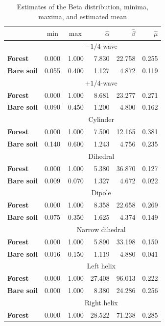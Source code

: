 \documentclass[conference]{IEEEtran}
\begin{document}
\balance
\begin{table}[hbt]
\centering
\caption{Estimates of the Beta distribution, minima, maxima, and estimated mean}\label{tab:estimated_params}     
\begin{tabular}{lrrrrr}
\toprule
& $\min$ & $\max$ & $\widehat\alpha$ & $\widehat\beta$ & $\widehat\mu$\\ \midrule
& \multicolumn{5}{c}{$-1/4$-wave}\\
\cmidrule(lr){2-6}
\textbf{Forest} & 0.000 & 1.000 & 7.830 & 22.758 & 0.255\\
\textbf{Bare soil} & 0.055 & 0.400 & 1.127 & 4.872 & 0.119\\
\midrule
%
& \multicolumn{5}{c}{$+1/4$-wave}\\
\cmidrule(lr){2-6}
\textbf{Forest} & 0.000 & 1.000 & 8.681 & 23.277 & 0.271\\
\textbf{Bare soil} & 0.090 & 0.450 & 1.200 & 4.800 & 0.162\\
\midrule
%
& \multicolumn{5}{c}{Cylinder}\\
\cmidrule(lr){2-6}
\textbf{Forest} & 0.000 & 1.000 & 7.500 & 12.165 & 0.381\\
\textbf{Bare soil} & 0.140 & 0.600 & 1.243 & 4.756 & 0.235\\
\midrule
%
& \multicolumn{5}{c}{Dihedral}\\
\cmidrule(lr){2-6}
\textbf{Forest} & 0.000 & 1.000 & 5.380 & 36.870 & 0.127\\
\textbf{Bare soil} & 0.009 & 0.070 & 1.327 & 4.672 & 0.022\\
\midrule
%
& \multicolumn{5}{c}{Dipole}\\
\textbf{Forest} & 0.000 & 1.000 & 8.358 & 22.658 & 0.269\\
\textbf{Bare soil} & 0.075 & 0.350 & 1.625 & 4.374 & 0.149\\
\midrule
%
& \multicolumn{5}{c}{Narrow dihedral}\\
\cmidrule(lr){2-6}
\textbf{Forest} & 0.000 & 1.000 & 5.890 & 33.198 & 0.150\\
\textbf{Bare soil} & 0.016 & 0.150 & 1.119 & 4.880 & 0.041\\
\midrule
%
& \multicolumn{5}{c}{Left helix}\\
\cmidrule(lr){2-6}
\textbf{Forest} & 0.000 & 1.000 & 27.408 & 96.013 & 0.222\\
\textbf{Bare soil} & 0.000 & 1.000 & 8.380 & 24.286 & 0.256\\
\midrule
& \multicolumn{5}{c}{Right helix}\\
\cmidrule(lr){2-6}
\textbf{Forest} & 0.000 & 1.000 & 28.522 & 71.238 & 0.285\\

\end{tabular}
\end{table}
\end{document}

